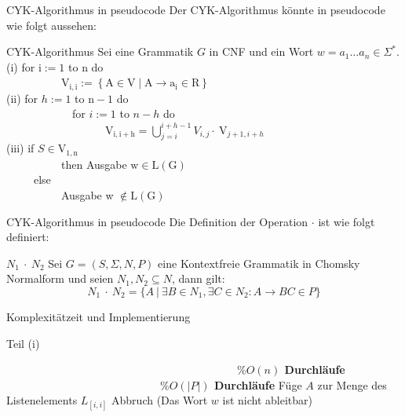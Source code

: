 \documentclass{beamer}
\begin{document}
	\begin{frame}{CYK-Algorithmus in pseudocode}
		Der CYK-Algorithmus könnte in pseudocode wie folgt aussehen:	
		\begin{block}{CYK-Algorithmus}
			Sei eine Grammatik $G$ in CNF und ein Wort $w=a_1 \ldots a_n \in \Sigma^*$.\\
			(i) for $\mathrm{i}:=1$ to $\mathrm{n}$ do\\
			\ \ \ \ \ \ \ \ \ \ $\mathrm{V}_{\mathrm{i}, \mathrm{i}}:=\left\{\mathrm{A} \in \mathrm{V} \mid \mathrm{A} \rightarrow \mathrm{a}_{\mathrm{i}} \in \mathrm{R}\right\}$\\
			(ii) for $h:=1$ to $\mathrm{n}-1$ do\\
			\ \ \ \ \ \ \ \ \ \ \ \ for $i:=1$ to $n-h$ do\\
			\ \ \ \ \ \ \ \ \ \ \ \ \ \ \ \ \ \ $\mathrm{V}_{\mathrm{i}, \mathrm{i}+\mathrm{h}}=\bigcup_{j=i}^{i+h-1} V_{i, j} \cdot \mathrm{~V}_{j+1, i+h}$\\
			(iii) if $S \in \mathrm{V}_{1, \mathrm{n}}$\\
			\ \ \ \ \ \ \ \ \ \ then Ausgabe $\mathrm{w} \in \mathrm{L}(\mathrm{G})$\\
			\ \ \ \ \ else\\
			\ \ \ \ \ \ \ \ \ \  Ausgabe w $\notin \mathrm{L}(\mathrm{G})$
		\end{block}
	\end{frame}

	\begin{frame}{CYK-Algorithmus in pseudocode}
		Die Definition der Operation $\cdot$ ist wie folgt definiert:
		\begin{block}{\textbf{$N_1 \ \cdot \ N_2$}}
			Sei $ G = (S, \Sigma, N, P)$ eine Kontextfreie Grammatik in Chomsky Normalform und seien $N_1,N_2 \subseteq N$, dann gilt:
			$$N_1 \ \cdot \ N_2 = \{A \ |\ \exists  B\in N_1 , \exists C\in N_2 : A\to BC \in P\}$$
		\end{block}
	\end{frame}


	\begin{frame}{Komplexitätzeit und Implementierung}
		\begin{algorithm}[H]
			\caption[Teil (i)]{Teil (i)}
			\label{algorithm9}
			\begin{algorithmic}[1]
				  \ \ \ \ \ \ \ \ \ \ \ \ \ \ \ \ \ \ \ \ \ \ \ \ \ \ \ \ \ \ \ \ \ \ \ \ \ \ \ \ \ \ \textbf{$ \%O(n)$ Durchläufe}
				 \ \ \ \ \ \ \ \ \ \ \ \ \ \ \ \ \ \ \ \ \ \ \ \ \ \ \ \ \textbf{$\%O(|P|)$ Durchläufe}
				\State Füge $A$ zur Menge des Listenelements $L_{[i,i]}$
				\Else
				\State Abbruch (Das Wort $w$ ist nicht ableitbar)
				\EndIf
				\EndFor
				\EndFor
			\end{algorithmic}
		\end{algorithm}
	\end{frame}
\end{document}
